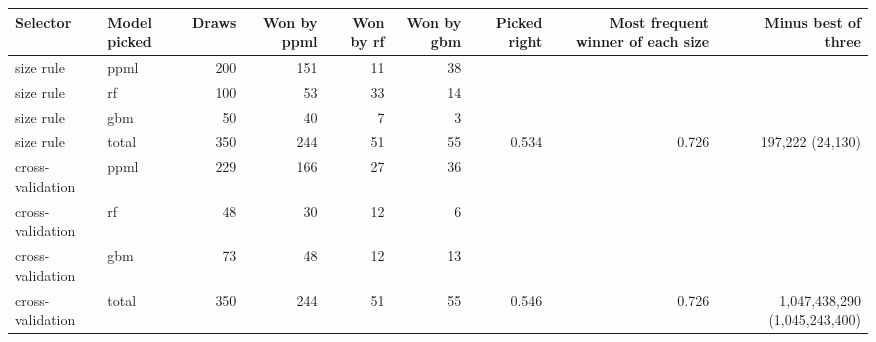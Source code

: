 \begin{tabular}{llrrrrrrr}
\toprule
Selector & Model picked & Draws & Won by ppml & Won by rf & Won by gbm & Picked right & Most frequent winner of each size & Minus best of three \\
\midrule
size rule & ppml & 200 & 151 & 11 & 38 &  &  &  \\
size rule & rf & 100 & 53 & 33 & 14 &  &  &  \\
size rule & gbm & 50 & 40 & 7 & 3 &  &  &  \\
size rule & total & 350 & 244 & 51 & 55 & 0.534 & 0.726 & 197,222 (24,130) \\
cross-validation & ppml & 229 & 166 & 27 & 36 &  &  &  \\
cross-validation & rf & 48 & 30 & 12 & 6 &  &  &  \\
cross-validation & gbm & 73 & 48 & 12 & 13 &  &  &  \\
cross-validation & total & 350 & 244 & 51 & 55 & 0.546 & 0.726 & 1,047,438,290 (1,045,243,400) \\
\bottomrule
\end{tabular}
